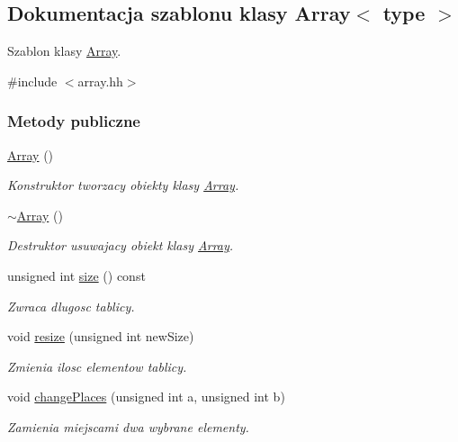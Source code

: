\hypertarget{class_array}{\subsection{Dokumentacja szablonu klasy Array$<$ type $>$}
\label{class_array}
}


Szablon klasy \hyperlink{class_array}{Array}.  




{\ttfamily \#include $<$array.\-hh$>$}

\subsubsection*{Metody publiczne}
\begin{DoxyCompactItemize}
\item 
\hyperlink{class_array_ab2edb009d36e9c096424fc8ba9e94257}{Array} ()
\begin{DoxyCompactList}\small\item\em Konstruktor tworzacy obiekty klasy \hyperlink{class_array}{Array}. \end{DoxyCompactList}\item 
\hyperlink{class_array_a3bb93ede1d268b3a76a1204e27bb962d}{$\sim$\-Array} ()
\begin{DoxyCompactList}\small\item\em Destruktor usuwajacy obiekt klasy \hyperlink{class_array}{Array}. \end{DoxyCompactList}\item 
unsigned int \hyperlink{class_array_a2966b07f15f2845436448b633baf162a}{size} () const 
\begin{DoxyCompactList}\small\item\em Zwraca dlugosc tablicy. \end{DoxyCompactList}\item 
void \hyperlink{class_array_a356eff3b67c9171081dc5aa010783877}{resize} (unsigned int new\-Size)
\begin{DoxyCompactList}\small\item\em Zmienia ilosc elementow tablicy. \end{DoxyCompactList}\item 
void \hyperlink{class_array_ad04cd18ce830f7e72dabdc184a0654c4}{change\-Places} (unsigned int a, unsigned int b)
\begin{DoxyCompactList}\small\item\em Zamienia miejscami dwa wybrane elementy. \end{DoxyCompactList}\item 

\end{DoxyCompactItemize}
